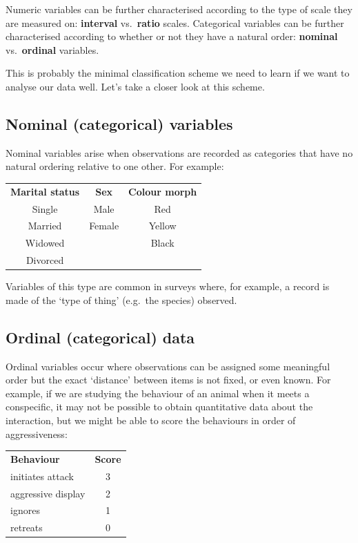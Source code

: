 \documentclass[
]{book}
\begin{document}
Numeric variables can be further characterised according to the type of scale they are measured on: \textbf{interval} vs.~\textbf{ratio} scales. Categorical variables can be further characterised according to whether or not they have a natural order: \textbf{nominal} vs.~\textbf{ordinal} variables.

This is probably the minimal classification scheme we need to learn if we want to analyse our data well. Let's take a closer look at this scheme.

\hypertarget{nominal-categorical-variables}{%
\subsection{Nominal (categorical) variables}\label{nominal-categorical-variables}}

Nominal variables arise when observations are recorded as categories that have no natural ordering relative to one other. For example:

\begin{longtable}[]{@{}ccc@{}}
\toprule
& & \\
\midrule
\endhead
\textbf{Marital status} & \textbf{Sex} & \textbf{Colour morph} \\
Single & Male & Red \\
Married & Female & Yellow \\
Widowed & & Black \\
Divorced & & \\
\bottomrule
\end{longtable}

Variables of this type are common in surveys where, for example, a record is made of the `type of thing' (e.g.~the species) observed.

\hypertarget{ordinal-categorical-data}{%
\subsection{Ordinal (categorical) data}\label{ordinal-categorical-data}}

Ordinal variables occur where observations can be assigned some meaningful order but the exact `distance' between items is not fixed, or even known. For example, if we are studying the behaviour of an animal when it meets a conspecific, it may not be possible to obtain quantitative data about the interaction, but we might be able to score the behaviours in order of aggressiveness:

\begin{longtable}[]{@{}lc@{}}
\toprule
& \\
\midrule
\endhead
\textbf{Behaviour} & \textbf{Score} \\
initiates attack & 3 \\
aggressive display & 2 \\
ignores & 1 \\
retreats & 0 \\
\bottomrule
\end{longtable}
\end{document}
